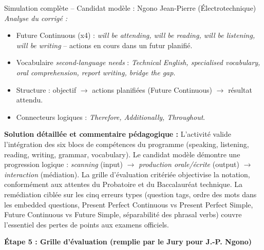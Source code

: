 \documentclass[11pt]{article}
\newcommand{\cle}[1]{{\popxbold\color{popdark}#1}}
\begin{document}
\begin{exoresolu}{Simulation complète -- Candidat modèle : Ngono Jean-Pierre (Électrotechnique)}
\textit{Analyse du corrigé :}
\begin{itemize}
    \item \cle{Future Continuous} (x4) : \emph{will be attending, will be reading, will be listening, will be writing} -- actions en cours dans un futur planifié.
    \item Vocabulaire \emph{second-language needs} : \emph{Technical English, specialised vocabulary, oral comprehension, report writing, bridge the gap}.
    \item Structure : objectif $\rightarrow$ actions planifiées (Future Continuous) $\rightarrow$ résultat attendu.
    \item Connecteurs logiques : \emph{Therefore, Additionally, Throughout}.
\end{itemize}
\tcblower
\textbf{Solution détaillée et commentaire pédagogique :} L'activité valide l'intégration des six blocs de compétences du programme (speaking, listening, reading, writing, grammar, vocabulary). Le candidat modèle démontre une progression logique : \emph{scanning} (input) $\rightarrow$ \emph{production orale/écrite} (output) $\rightarrow$ \emph{interaction} (médiation). La grille d'évaluation critériée objectivise la notation, conformément aux attentes du Probatoire et du Baccalauréat technique. La remédiation ciblée sur les cinq erreurs types (question tags, ordre des mots dans les embedded questions, Present Perfect Continuous vs Present Perfect Simple, Future Continuous vs Future Simple, séparabilité des phrasal verbs) couvre l'essentiel des pertes de points aux examens officiels.
\end{exoresolu}

\textbf{Étape 5 : Grille d'évaluation (remplie par le Jury pour J.-P. Ngono)}
\end{document}
